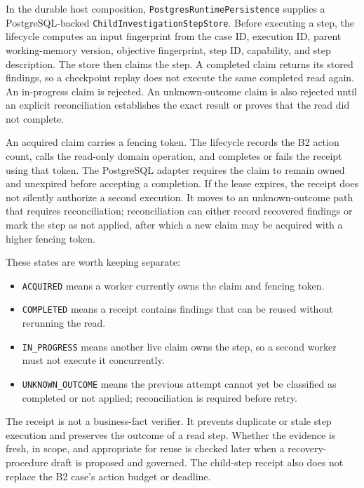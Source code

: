 In the durable host composition, \texttt{Postgres\allowbreak Runtime\allowbreak Persistence} supplies a PostgreSQL-backed \texttt{Child\allowbreak Investigation\allowbreak Step\allowbreak Store}. Before executing a step, the lifecycle computes an input fingerprint from the case ID, execution ID, parent working-memory version, objective fingerprint, step ID, capability, and step description. The store then claims the step. A completed claim returns its stored findings, so a checkpoint replay does not execute the same completed read again. An in-progress claim is rejected. An unknown-outcome claim is also rejected until an explicit reconciliation establishes the exact result or proves that the read did not complete.

An acquired claim carries a fencing token. The lifecycle records the B2 action count, calls the read-only domain operation, and completes or fails the receipt using that token. The PostgreSQL adapter requires the claim to remain owned and unexpired before accepting a completion. If the lease expires, the receipt does not silently authorize a second execution. It moves to an unknown-outcome path that requires reconciliation; reconciliation can either record recovered findings or mark the step as not applied, after which a new claim may be acquired with a higher fencing token.

These states are worth keeping separate:

\begin{itemize}
  \item \texttt{ACQUIRED} means a worker currently owns the claim and fencing token.
  \item \texttt{COMPLETED} means a receipt contains findings that can be reused without rerunning the read.
  \item \texttt{IN\_PROGRESS} means another live claim owns the step, so a second worker must not execute it concurrently.
  \item \texttt{UNKNOWN\_\allowbreak OUTCOME} means the previous attempt cannot yet be classified as completed or not applied; reconciliation is required before retry.
\end{itemize}

The receipt is not a business-fact verifier. It prevents duplicate or stale step execution and preserves the outcome of a read step. Whether the evidence is fresh, in scope, and appropriate for reuse is checked later when a recovery-procedure draft is proposed and governed. The child-step receipt also does not replace the B2 case's action budget or deadline.

